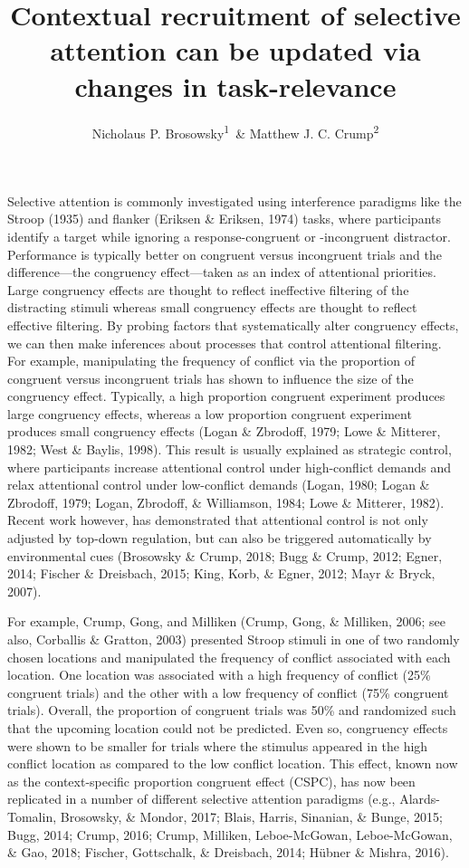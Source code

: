 \documentclass[english,,man,floatsintext]{apa6}
\title{Contextual recruitment of selective attention can be updated via changes in task-relevance}
\author{Nicholaus P. Brosowsky\textsuperscript{1}~\& Matthew J. C. Crump\textsuperscript{2}}
\date{}
\affiliation{
\vspace{0.5cm}
\textsuperscript{1} The Graduate Center of the City University of New York\\\textsuperscript{2} Brooklyn College of the City University of New York}
\begin{document}
\maketitle

Selective attention is commonly investigated using interference paradigms like the Stroop (1935) and flanker (Eriksen \& Eriksen, 1974) tasks, where participants identify a target while ignoring a response-congruent or -incongruent distractor. Performance is typically better on congruent versus incongruent trials and the difference---the congruency effect---taken as an index of attentional priorities. Large congruency effects are thought to reflect ineffective filtering of the distracting stimuli whereas small congruency effects are thought to reflect effective filtering. By probing factors that systematically alter congruency effects, we can then make inferences about processes that control attentional filtering. For example, manipulating the frequency of conflict via the proportion of congruent versus incongruent trials has shown to influence the size of the congruency effect. Typically, a high proportion congruent experiment produces large congruency effects, whereas a low proportion congruent experiment produces small congruency effects (Logan \& Zbrodoff, 1979; Lowe \& Mitterer, 1982; West \& Baylis, 1998). This result is usually explained as strategic control, where participants increase attentional control under high-conflict demands and relax attentional control under low-conflict demands (Logan, 1980; Logan \& Zbrodoff, 1979; Logan, Zbrodoff, \& Williamson, 1984; Lowe \& Mitterer, 1982). Recent work however, has demonstrated that attentional control is not only adjusted by top-down regulation, but can also be triggered automatically by environmental cues (Brosowsky \& Crump, 2018; Bugg \& Crump, 2012; Egner, 2014; Fischer \& Dreisbach, 2015; King, Korb, \& Egner, 2012; Mayr \& Bryck, 2007).

For example, Crump, Gong, and Milliken (Crump, Gong, \& Milliken, 2006; see also, Corballis \& Gratton, 2003) presented Stroop stimuli in one of two randomly chosen locations and manipulated the frequency of conflict associated with each location. One location was associated with a high frequency of conflict (25\% congruent trials) and the other with a low frequency of conflict (75\% congruent trials). Overall, the proportion of congruent trials was 50\% and randomized such that the upcoming location could not be predicted. Even so, congruency effects were shown to be smaller for trials where the stimulus appeared in the high conflict location as compared to the low conflict location. This effect, known now as the context-specific proportion congruent effect (CSPC), has now been replicated in a number of different selective attention paradigms (e.g., Alards-Tomalin, Brosowsky, \& Mondor, 2017; Blais, Harris, Sinanian, \& Bunge, 2015; Bugg, 2014; Crump, 2016; Crump, Milliken, Leboe-McGowan, Leboe-McGowan, \& Gao, 2018; Fischer, Gottschalk, \& Dreisbach, 2014; Hübner \& Mishra, 2016).
\end{document}
